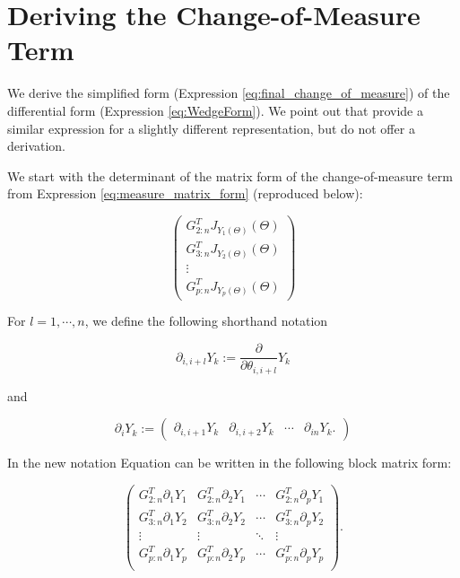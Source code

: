 \documentclass[ba]{imsart}
\numberwithin{equation}{section}
\theoremstyle{plain}
\begin{document}
\appendix
\section{Deriving the Change-of-Measure Term}
We derive the simplified form (Expression \ref{eq:final_change_of_measure}) of the differential form (Expression \ref{eq:WedgeForm}). We point out that \cite{khatri1977mises} provide a similar expression for a slightly different representation, but do not offer a derivation.

\noindent We start with the determinant of the matrix form of the change-of-measure term from Expression \ref{eq:measure_matrix_form} (reproduced below):

\begin{equation}
\begin{pmatrix}
G_{2:n}^T J_{Y_1(\Theta)}(\Theta)\\
G_{3:n}^T J_{Y_2(\Theta)}(\Theta)\\
\vdots\\
G_{p:n}^T J_{Y_p(\Theta)}(\Theta)
\end{pmatrix}
\end{equation}

\noindent For $l = 1, \cdots, n$, we define the following shorthand notation

\begin{equation}
\partial_{i,i+l} Y_k := \frac{\partial}{\partial \theta_{i,i+l}} Y_k
\end{equation}

\noindent and

\begin{equation}
\partial_{i} Y_k
:=
\begin{pmatrix}
\partial_{i,i+1} Y_k & \partial_{i,i+2} Y_k & \cdots & \partial_{in} Y_k.
\end{pmatrix}
\end{equation}

\noindent In the new notation Equation can be written in the following block matrix form:

\begin{equation}
\label{eq:matrix_blockform}
\begin{pmatrix}
G_{2:n}^T \partial_{1} Y_1 &G_{2:n}^T \partial_{2} Y_1 & \cdots & G_{2:n}^T \partial_{p} Y_1\\
G_{3:n}^T \partial_{1} Y_2 &G_{3:n}^T \partial_{2} Y_2 & \cdots & G_{3:n}^T \partial_{p} Y_2\\
\vdots & \vdots & \ddots & \vdots\\
G_{p:n}^T \partial_{1} Y_p &G_{p:n}^T \partial_{2} Y_p & \cdots & G_{p:n}^T \partial_{p} Y_p\\
\end{pmatrix}.
\end{equation}
\end{document}
